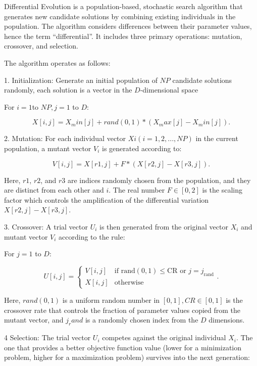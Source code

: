 \documentclass[a4paper,12pt]{article}
\begin{document}
Differential Evolution is a population-based, stochastic search algorithm that generates new candidate solutions by combining existing individuals in the population. The algorithm considers differences between their parameter values, hence the term ``differential''. It includes three primary operations: mutation, crossover, and selection.

The algorithm operates as follows:

1. Initialization: Generate an initial population of $NP$ candidate solutions randomly, each solution is a vector in the $D$-dimensional space
    
    For $i = 1 $to $NP, j = 1$ to $D$:
    
    $$X[i, j] = X_min[j] + rand(0, 1) * (X_max[j] - X_min[j]) .$$
    
2. Mutation: For each individual vector $Xi (i=1, 2, ..., NP)$ in the current population, a mutant vector $V_i$ is generated according to:

    $$V[i, j] = X[r1, j] + F * (X[r2, j] - X[r3, j]) .$$

    Here, $r1$, $r2$, and $r3$ are indices randomly chosen from the population, and they are distinct from each other and $i$. The real number $F \in [0,2]$ is the scaling factor which controls the amplification of the differential variation $X[r2, j] - X[r3, j]$.

3. Crossover: A trial vector $U_i$ is then generated from the original vector $X_i$ and mutant vector $V_i$ according to the rule:

    For $j = 1$ to $D$:
    
    $$
        U[i, j] =
        \begin{cases}
            V[i, j] & \text{if } \text{rand}(0,1) \leq \text{CR} \text{ or } j = j_{\text{rand}} \\
            X[i, j] & \text{otherwise}
        \end{cases} .
    $$

Here, $rand(0,1)$ is a uniform random number in $[0,1], CR \in [0,1]$ is the crossover rate that controls the fraction of parameter values copied from the mutant vector, and $j_rand$ is a randomly chosen index from the $D$ dimensions.

4 Selection: The trial vector $U_i$ competes against the original individual $X_i$. The one that provides a better objective function value (lower for a minimization problem, higher for a maximization problem) survives into the next generation:
\end{document}
